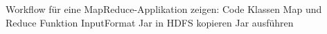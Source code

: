 \label{chap:fund sec:core sub:handson mapred}
Workflow für eine MapReduce-Applikation zeigen:
Code
Klassen
Map und Reduce Funktion
InputFormat
Jar in HDFS kopieren
Jar ausführen
\begin{comment}
    \subsubsection*{Fully-distributed Cluster}
Installation von Hadoop auf allen beteiligten Maschinen
Einrichtung von passwordless ssh auf allen Maschinen
Evtl. Anpassung der /etc/hosts auf allen Maschinen
Editieren der ganzen Konfigurationsdateien (XML) und kopieren der gleichen Dateien auf alle beteiligten Maschinen
Editieren der Worker Datei auf dem NameNode
NameNode (HDFS) formatieren
Ausführen der Skripte auf dem NameNode

\subsubsection*{Hadoop in der Cloud}
Dabei kann man statt des HDFS zur Datenhaltung die jeweiligen Cloud Storage Systeme (Google Cloud Storage\footnote{https://cloud.google.com/blog/products/storage-data-transfer/hdfs-vs-cloud-storage-pros-cons-and-migration-tips} und Azure Storage / Azure Data Lake Storage\footnote{https://learn.microsoft.com/en-us/azure/hdinsight/hdinsight-hadoop-architecture}) nutzen.
Grafische Oberfläche zum Submitten von Jobs, etc.

\end{comment}


